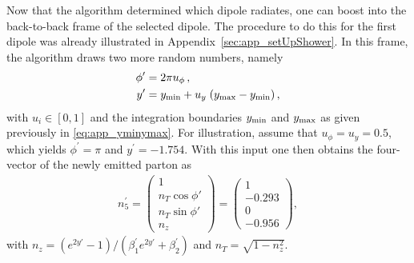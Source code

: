 \documentclass[11pt,a4paper]{article}
\begin{document}
Now that the algorithm determined which dipole radiates, one can boost into  the back-to-back frame of  the selected dipole. The procedure to do this for the first dipole was already illustrated in Appendix~\ref{sec:app_setUpShower}.
In this frame, the algorithm draws two more random numbers, namely 
\begin{align}
\phi'&= 2\pi u_\phi\, , \nonumber \\
y'&=y_{{\rm min}}+u_y\;(y_{{\rm max}}-y_{{\rm min}}) \, , \label{eq:yprime}
\end{align}
with $u_i\in[0,1]$ and the integration boundaries $y_{{\rm min}}$ and $y_{{\rm max}}$ as given previously in \eqref{eq:app_yminymax}. For illustration, assume that $u_\phi=u_y=0.5$, which yields $\phi^\prime=\pi$ and $y^\prime=-1.754$. With this input one then obtains the four-vector of the newly emitted parton as
\begin{align}
n^\prime_5=\left(\begin{matrix} 1\\n_T \cos \phi'\\ n_T \sin \phi'\\ n_z \end{matrix}\right) = \left(\begin{matrix} 1\\-0.293\\0\\ -0.956\end{matrix}\right) , \label{eq:n5pp}
\end{align}
with $n_z =(e^{2y'} -1 )/(\beta_1^\prime e^{2y'} + \beta_2^\prime)$ and $n_T = \sqrt{1-n_z^2}$. 
\end{document}
